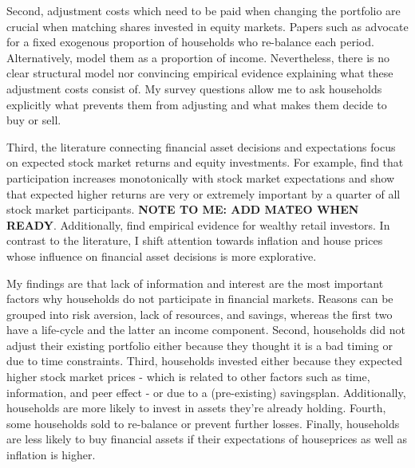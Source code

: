 \documentclass[ProjectABM]{subfiles}
\begin{document}
Second, adjustment costs which need to be paid when changing the portfolio are crucial when matching shares invested in equity markets. Papers such as \cite{giglio_et_al_2019five} advocate for a fixed exogenous proportion of households who re-balance each period. Alternatively,  \cite{bonaparte_et_al_2012adjustment} model them as a proportion of income. Nevertheless, there is no clear structural model nor convincing empirical evidence explaining what these adjustment costs consist of. My survey questions allow me to ask households explicitly what prevents them from adjusting and what makes them decide to buy or sell.

Third, the literature connecting financial asset decisions and expectations focus on expected stock market returns and equity investments. For example, \cite{arrondel_et_al_2014subjective_return_expectation} find that participation increases monotonically with stock market expectations and \cite{choi_2020} show that expected higher returns are very or extremely important by a quarter of all stock market participants. \textbf{NOTE TO ME: ADD MATEO WHEN READY}. Additionally, \cite{giglio_et_al_2019five} find empirical evidence for wealthy retail investors. In contrast to the literature, I shift attention towards inflation and house prices whose influence on financial asset decisions is more explorative. %


My findings are that lack of information and interest are the most important factors why households do not participate in financial markets. Reasons can be grouped into risk aversion, lack of resources, and savings, whereas the first two have a life-cycle and the latter an income component. Second, households did not adjust their existing portfolio either because they thought it is a bad timing or due to time constraints. Third, households invested either because they expected higher stock market prices - which is related to other factors such as time, information, and peer effect - or due to a (pre-existing) savingsplan. Additionally, households are more likely to invest in assets they're already holding. Fourth, some households sold to re-balance or prevent further losses. Finally, households are less likely to buy financial assets if their expectations of houseprices as well as inflation is higher.
\end{document}
